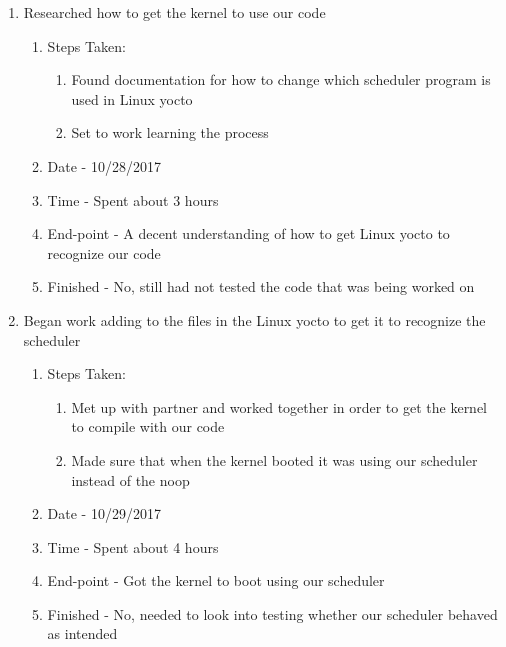 \documentclass[journal,10pt,onecolumn,compsoc]{IEEEtran} \usepackage[margin=1.0in]{geometry} \usepackage{pdfpages}
\begin{document}
\begin{enumerate}
	\item Researched how to get the kernel to use our code
		\begin{enumerate}
			\item Steps Taken:
				\begin{enumerate}
					\item Found documentation for how to change which scheduler program is used in Linux yocto
                    \item Set to work learning the process
				\end{enumerate}
			\item Date - 10/28/2017
			\item Time - Spent about 3 hours
			\item End-point - A decent understanding of how to get Linux yocto to recognize our code
			\item Finished - No, still had not tested the code that was being worked on \\
		\end {enumerate}
        
	\item Began work adding to the files in the Linux yocto to get it to recognize the scheduler
		\begin{enumerate}
			\item Steps Taken:
				\begin{enumerate}
					\item Met up with partner and worked together in order to get the kernel to compile with our code
                    \item Made sure that when the kernel booted it was using our scheduler instead of the noop
				\end{enumerate}
			\item Date - 10/29/2017
			\item Time - Spent about 4 hours
			\item End-point - Got the kernel to boot using our scheduler
			\item Finished - No, needed to look into testing whether our scheduler behaved as intended \\
		\end {enumerate}
        

\end{enumerate}
\end{document}
